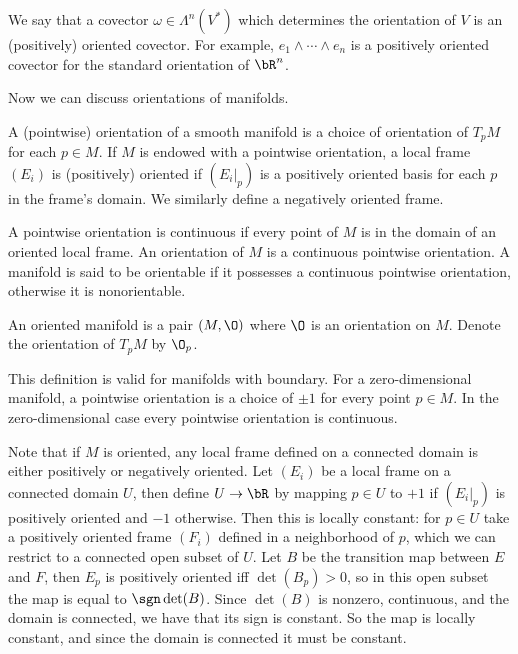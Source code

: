 \eproof

We say that a covector $\omega\in\Lambda^n(V^*)$ which determines the orientation of $V$ is an {\emphcolor (positively) oriented covector}.
For example, $e_1\wedge\cdots\wedge e_n$ is a positively oriented covector for the standard orientation of $\bR^n$.

Now we can discuss orientations of manifolds.

\bdefn

    A {\emphcolor (pointwise) orientation} of a smooth manifold is a choice of orientation of $T_pM$ for each $p\in M$.
    If $M$ is endowed with a pointwise orientation, a local frame $(E_i)$ is {\emphcolor (positively) oriented} if $(E_i|_p)$
    is a positively oriented basis for each $p$ in the frame's domain.
    We similarly define a negatively oriented frame.

    A pointwise orientation is {\emphcolor continuous} if every point of $M$ is in the domain of an oriented local frame.
    An {\emphcolor orientation} of $M$ is a continuous pointwise orientation.
    A manifold is said to be {\emphcolor orientable} if it possesses a continuous pointwise orientation, otherwise it is
    {\emphcolor nonorientable}.

    An {\emphcolor oriented manifold} is a pair $(M,\O)$ where $\O$ is an orientation on $M$.
    Denote the orientation of $T_pM$ by $\O_p$.

\edefn

This definition is valid for manifolds with boundary.
For a zero-dimensional manifold, a pointwise orientation is a choice of $\pm1$ for every point $p\in M$.
In the zero-dimensional case every pointwise orientation is continuous.

Note that if $M$ is oriented, any local frame defined on a connected domain is either positively or negatively oriented.
Let $(E_i)$ be a local frame on a connected domain $U$, then define $U\to\bR$ by mapping $p\in U$ to $+1$ if $(E_i|_p)$ is
positively oriented and $-1$ otherwise.
Then this is locally constant: for $p\in U$ take a positively oriented frame $(F_i)$ defined in a neighborhood of $p$,
which we can restrict to a connected open subset of $U$.
Let $B$ be the transition map between $E$ and $F$, then $E_p$ is positively oriented iff $\det(B_p)>0$, so in this open
subset the map is equal to $\sgn\det(B)$.
Since $\det(B)$ is nonzero, continuous, and the domain is connected, we have that its sign is constant.
So the map is locally constant, and since the domain is connected it must be constant.

